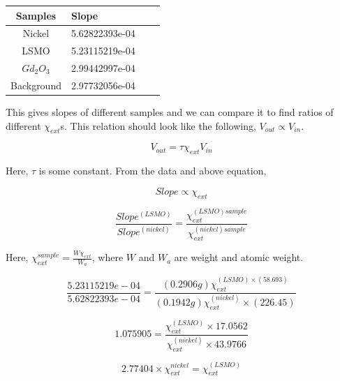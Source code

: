 \noindent\setlength\tabcolsep{4pt}%
\begin{center}
\begin{tabularx}{.8\linewidth}{|c|Y|c|Y}
  \hline
  \hline
  Samples & Slope \\
  \hline
Nickel  & 5.62822393e-04 \\
LSMO  & 5.23115219e-04 \\
$Gd_2O_3$  & 2.99442997e-04 \\
Background  & 2.97732056e-04 \\
\hline
\hline
\end{tabularx}
\vskip1cm
\label{fig:Slopes}
\end{center}


This gives slopes of different samples and we can compare it to find ratios of different $\chi_{ext}$s. This relation should look like the following, $V_{out} \propto V_{in}$.
 
\begin{equation*}
V_{out} = \tau \chi_{ext} V_{in} 
\end{equation*}

Here, $\tau$ is some constant. From the data and above equation,  

\begin{equation*}
Slope \propto \chi_{ext}
\end{equation*}

\begin{equation*}
\frac{Slope^{(LSMO)}}{Slope^{(nickel)}} = \frac{\chi_{ext}^{(LSMO) sample}}{\chi_{ext}^{(nickel) sample}}
\end{equation*}

Here, $\chi_{ext}^{sample}= \frac{W \chi_{ext}}{W_a}$, where $W$ and $W_a$ are weight and atomic weight.

\begin{equation*}
\frac{5.23115219e-04}{5.62822393e-04} = \frac{(0.2906 g)\chi_{ext}^{(LSMO) \times (58.693)}}{(0.1942 g)\chi_{ext}^{(nickel)} \times (226.45)}
\end{equation*}

\begin{equation*}
1.075905 = \frac{\chi_{ext}^{(LSMO)}\times 17.0562}{\chi_{ext}^{(nickel)} \times 43.9766}
\end{equation*}

\begin{equation*}
2.77404 \times \chi_{ext}^{nickel} = \chi_{ext}^{(LSMO)}
\end{equation*}

